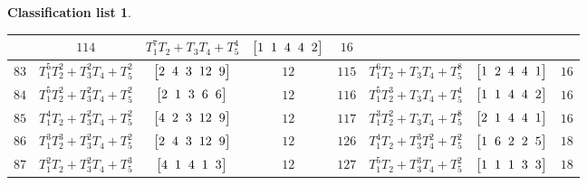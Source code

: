 \documentclass[pdftex]{sigma}%
\theoremstyle{definition}
\newtheorem{class-list}[thm]{Classification list}
\numberwithin{equation}{section}
\begin{document}
\begin{class-list}
\begin{table}[t!]
\begin{tabu}{c|c|c|c||c|c|c|c}
&${114}$&${T_{1}^{7}T_{2}+T_{3}T_{4}+T_{5}^{4}}$
&$\arraycolsep=1mm\begin{bmatrix}{1} & {1} & {4} & {4} & {2}\end{bmatrix}$&${16}$
\\
\hline
${83}$&${T_{1}^{5}T_{2}^{2}+T_{3}^{2}T_{4}+T_{5}^{2}}$
&$\arraycolsep=1mm\begin{bmatrix}{2} & {4} & {3} & {12} & {9}\end{bmatrix}$&${12}$
&${115}$&${T_{1}^{6}T_{2}+T_{3}T_{4}+T_{5}^{8}}$
&$\arraycolsep=1mm\begin{bmatrix}{1} & {2} & {4} & {4} & {1}\end{bmatrix}$&${16}$
\\
\hline
${84}$&${T_{1}^{5}T_{2}^{2}+T_{3}^{2}T_{4}+T_{5}^{2}}$
&$\arraycolsep=1mm\begin{bmatrix}{2} & {1} & {3} & {6} & {6}\end{bmatrix}$&${12}$
&${116}$&${T_{1}^{5}T_{2}^{3}+T_{3}T_{4}+T_{5}^{4}}$
&$\arraycolsep=1mm\begin{bmatrix}{1} & {1} & {4} & {4} & {2}\end{bmatrix}$&${16}$
\\
\hline
${85}$&${T_{1}^{4}T_{2}+T_{3}^{2}T_{4}+T_{5}^{2}}$
&$\arraycolsep=1mm\begin{bmatrix}{4} & {2} & {3} & {12} & {9}\end{bmatrix}$&${12}$
&${117}$&${T_{1}^{3}T_{2}^{2}+T_{3}T_{4}+T_{5}^{8}}$
&$\arraycolsep=1mm\begin{bmatrix}{2} & {1} & {4} & {4} & {1}\end{bmatrix}$&${16}$
\\
\hline
${86}$&${T_{1}^{3}T_{2}^{3}+T_{3}^{2}T_{4}+T_{5}^{2}}$
&$\arraycolsep=1mm\begin{bmatrix}{2} & {4} & {3} & {12} & {9}\end{bmatrix}$&${12}$
&${126}$&${T_{1}^{4}T_{2}+T_{3}^{3}T_{4}^{2}+T_{5}^{2}}$
&$\arraycolsep=1mm\begin{bmatrix}{1} & {6} & {2} & {2} & {5}\end{bmatrix}$&${18}$
\\
\hline
${87}$&${T_{1}^{2}T_{2}+T_{3}^{2}T_{4}+T_{5}^{3}}$
&$\arraycolsep=1mm\begin{bmatrix}{4} & {1} & {4} & {1} & {3}\end{bmatrix}$&${12}$
&${127}$&${T_{1}^{5}T_{2}+T_{3}^{3}T_{4}+T_{5}^{2}}$
&$\arraycolsep=1mm\begin{bmatrix}{1} & {1} & {1} & {3} & {3}\end{bmatrix}$&${18}$
\\
\hline
\end{tabu}\vspace{-4mm}
\end{table}



\end{class-list}
\end{document}
